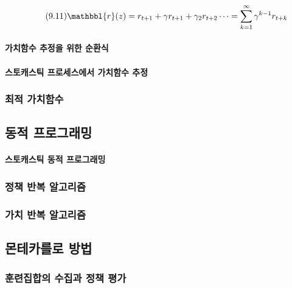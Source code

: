\documentclass [12pt] {oblivoir}
\let\oldsubsubsection=\subsubsection
\renewcommand{\subsubsection}
{
  \filbreak
  \oldsubsubsection
}
\begin{document}
\begin{equation} \tag{9.11}
  \mathbbl{r}(z) = r_{t+1} + \gamma r_{t+1} + \gamma_{2} r_{t+2} \cdots = \sum_{k=1}^{\infty}\gamma^{k-1}r_{t+k}
\end{equation}

\vspace{3mm}

\paragraph*{가치함수 추정을 위한 순환식}\mbox{}

\vspace{3mm}

\paragraph*{스토캐스틱 프로세스에서 가치함수 추정}\mbox{}

\vspace{3mm}

\subsubsection{최적 가치함수}

\subsection{동적 프로그래밍}

\paragraph*{스토캐스틱 동적 프로그래밍}\mbox{}

\vspace{3mm}

\subsubsection{정책 반복 알고리즘}

\subsubsection{가치 반복 알고리즘}

\subsection{몬테카를로 방법}

\subsubsection{훈련집합의 수집과 정책 평가}
\end{document}
